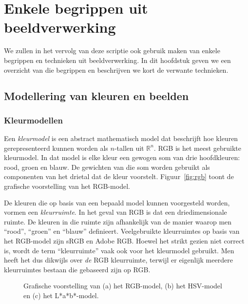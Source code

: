 \chapter{Enkele begrippen uit beeldverwerking}

We zullen in het vervolg van deze scriptie ook gebruik maken van enkele
begrippen en technieken uit beeldverwerking. In dit hoofdstuk geven we 
een overzicht van die begrippen en beschrijven we kort de verwante
technieken.

\section{Modellering van kleuren en beelden}

\subsection{Kleurmodellen}

Een \emph{kleurmodel} is een abstract mathematisch model dat beschrijft hoe kleuren gerepresenteerd 
kunnen worden als $n$-tallen uit $\mathbb{R}^n$. RGB is het meest gebruikte kleurmodel. In dat model is elke kleur
een gewogen som van drie hoofdkleuren: rood, groen en blauw. De gewichten van die som
worden gebruikt als componenten van het drietal dat de kleur voorstelt. Figuur~\ref{fig:rgb}
toont de grafische voorstelling van het RGB-model.

De kleuren die op basis van een bepaald model kunnen voorgesteld worden, vormen een \emph{kleurruimte}. 
In het geval van RGB is dat een driedimensionale ruimte. De kleuren in die ruimte zijn afhankelijk
van de manier waarop men ``rood'', ``groen'' en ``blauw'' definieert. Veelgebruikte kleurruimtes 
op basis van het RGB-model zijn sRGB en Adobe RGB.
Hoewel het strikt gezien niet correct is, wordt de term ``kleurruimte'' vaak ook voor het
kleurmodel gebruikt. Men heeft het dus dikwijls over \emph{de} RGB kleurruimte, terwijl er eigenlijk meerdere
kleurruimtes bestaan die gebaseerd zijn op RGB. 

\begin{figure}[tp]
\begin{center}
\qquad
{}
\qquad
{}
\caption{\label{fig:kleurmodellen}Grafische voorstelling van (a) het RGB-model, (b) het HSV-model en (c) het L*a*b*-model.}
\end{center}
\end{figure}

